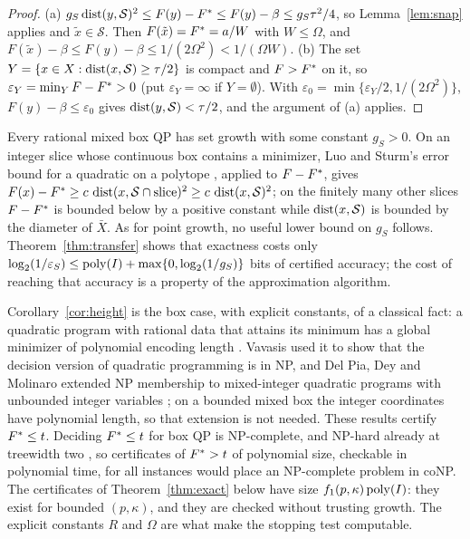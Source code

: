 \begin{proof}
(a) $g_S\operatorname{dist}(y,\mathcal S)^2\le F(y)-F^{*}\le F(y)-\beta\le g_S\tau^2/4$, so
Lemma~\ref{lem:snap} applies and $\tilde x\in\mathcal S$. Then
$F(\tilde x)=F^{*}=a/W$ with $W\le \Omega$, and
$F(\tilde x)-\beta\le F(y)-\beta\le1/(2\Omega^2)<1/(\Omega W)$.
(b) The set $Y=\{x\in X:\operatorname{dist}(x,\mathcal S)\ge\tau/2\}$ is compact and
$F>F^{*}$ on it, so $\varepsilon_Y=\min_YF-F^{*}>0$ (put $\varepsilon_Y=\infty$
if $Y=\emptyset$). With $\varepsilon_0=\min\{\varepsilon_Y/2,1/(2\Omega^2)\}$,
$F(y)-\beta\le\varepsilon_0$ gives $\operatorname{dist}(y,\mathcal S)<\tau/2$, and the
argument of (a) applies.
\end{proof}

\begin{remark}\label{rem:setgrowth}
Every rational mixed box QP has set growth with some constant $g_S>0$. On an
integer slice whose continuous box contains a minimizer, Luo and Sturm's error
bound for a quadratic on a polytope \cite[Theorem~3.3]{LuoSturm2000}, applied
to $F-F^{*}$, gives
$F(x)-F^{*}\ge c\,\operatorname{dist}(x,\mathcal S\cap\text{slice})^2\ge c\,\operatorname{dist}(x,\mathcal S)^2$;
on the finitely many other slices $F-F^{*}$ is bounded below by a positive
constant while $\operatorname{dist}(x,\mathcal S)$ is bounded by the diameter of $\bar X$.
As for point growth, no useful lower bound on $g_S$ follows.
Theorem~\ref{thm:transfer} shows that exactness costs only
$\log_2(1/\varepsilon_S)\le\operatorname{poly}(I)+\max\{0,\log_2(1/g_S)\}$ bits of
certified accuracy; the cost of reaching that accuracy is a property of the
approximation algorithm.
\end{remark}

\begin{remark}\label{rem:np}
Corollary~\ref{cor:height} is the box case, with explicit constants, of a
classical fact: a quadratic program with rational data that attains its
minimum has a global minimizer of polynomial encoding length
\cite{Vavasis1990}. Vavasis used it to show that the decision version of
quadratic programming is in NP, and Del Pia, Dey and Molinaro extended NP
membership to mixed-integer quadratic programs with unbounded integer
variables \cite{DelPiaDeyMolinaro2017}; on a bounded mixed box the integer
coordinates have polynomial length, so that extension is not needed. These
results certify $F^{*}\le t$. Deciding $F^{*}\le t$ for box QP is NP-complete,
and NP-hard already at treewidth two \cite{DelPiaKhajavirad2026}, so
certificates of $F^{*}>t$ of polynomial size, checkable in polynomial time, for
all instances would place an NP-complete problem in coNP. The certificates of
Theorem~\ref{thm:exact} below have size $f_1(p,\kappa)\operatorname{poly}(I)$: they exist
for bounded $(p,\kappa)$, and they are checked without trusting growth. The
explicit constants $R$ and $\Omega$ are what make the stopping test
computable.
\end{remark}

